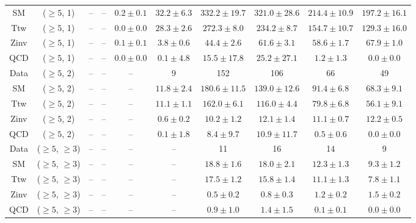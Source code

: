 \begin{table}[h!]
{\begin{tabular}{cccccccccc}
	SM & ($\ge5$, 1) & -- & -- & $0.2\pm 0.1$ & $32.2\pm 6.3$ & $332.2\pm 19.7$ & $321.0\pm 28.6$ & $214.4\pm 10.9$ & $197.2\pm 16.1$ \\[0.5ex] 
	Ttw & ($\ge5$, 1) & -- & -- & $0.0\pm 0.0$ & $28.3\pm 2.6$ & $272.3\pm 8.0$ & $234.2\pm 8.7$ & $154.7\pm 10.7$ & $129.3\pm 16.0$ \\[0.5ex] 
	Zinv & ($\ge5$, 1) & -- & -- & $0.1\pm 0.1$ & $3.8\pm 0.6$ & $44.4\pm 2.6$ & $61.6\pm 3.1$ & $58.6\pm 1.7$ & $67.9\pm 1.0$ \\[0.5ex] 
	QCD & ($\ge5$, 1) & -- & -- & $0.0\pm 0.0$ & $0.1\pm 4.8$ & $15.5\pm 17.8$ & $25.2\pm 27.1$ & $1.2\pm 1.3$ & $0.0\pm 0.0$ \\[0.5ex] 
	Data & ($\ge5$, 2) & -- & -- & -- & 9 & 152 & 106 & 66 & 49 \\[0.5ex] 
	SM & ($\ge5$, 2) & -- & -- & -- & $11.8\pm 2.4$ & $180.6\pm 11.5$ & $139.0\pm 12.6$ & $91.4\pm 6.8$ & $68.3\pm 9.1$ \\[0.5ex] 
	Ttw & ($\ge5$, 2) & -- & -- & -- & $11.1\pm 1.1$ & $162.0\pm 6.1$ & $116.0\pm 4.4$ & $79.8\pm 6.8$ & $56.1\pm 9.1$ \\[0.5ex] 
	Zinv & ($\ge5$, 2) & -- & -- & -- & $0.6\pm 0.2$ & $10.2\pm 1.2$ & $12.1\pm 1.4$ & $11.1\pm 0.7$ & $12.2\pm 0.5$ \\[0.5ex] 
	QCD & ($\ge5$, 2) & -- & -- & -- & $0.1\pm 1.8$ & $8.4\pm 9.7$ & $10.9\pm 11.7$ & $0.5\pm 0.6$ & $0.0\pm 0.0$ \\[0.5ex] 
	Data & ($\ge5$, $\ge3$) & -- & -- & -- & -- & 11 & 16 & 14 & 9 \\[0.5ex] 
	SM & ($\ge5$, $\ge3$) & -- & -- & -- & -- & $18.8\pm 1.6$ & $18.0\pm 2.1$ & $12.3\pm 1.3$ & $9.3\pm 1.2$ \\[0.5ex] 
	Ttw & ($\ge5$, $\ge3$) & -- & -- & -- & -- & $17.5\pm 1.2$ & $15.8\pm 1.4$ & $11.1\pm 1.3$ & $7.8\pm 1.1$ \\[0.5ex] 
	Zinv & ($\ge5$, $\ge3$) & -- & -- & -- & -- & $0.5\pm 0.2$ & $0.8\pm 0.3$ & $1.2\pm 0.2$ & $1.5\pm 0.2$ \\[0.5ex] 
	QCD & ($\ge5$, $\ge3$) & -- & -- & -- & -- & $0.9\pm 1.0$ & $1.4\pm 1.5$ & $0.1\pm 0.1$ & $0.0\pm 0.0$ \\[0.5ex] 
	\hline
	\hline
\end{tabular}}
\end{table}
